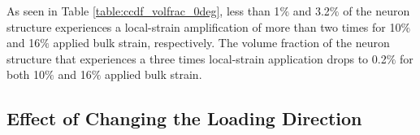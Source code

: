 \documentclass[]{interact}
\begin{document}
As seen in Table \ref{table:ccdf_volfrac_0deg}, less than 1$\%$ and 3.2$\%$ of the neuron structure experiences a local-strain amplification of more than two times for 10$\%$ and 16$\%$ applied bulk strain, respectively. The volume fraction of the neuron structure that experiences a three times local-strain application drops to 0.2$\%$ for both 10$\%$ and 16$\%$ applied bulk strain.



\subsection{Effect of Changing the Loading Direction}
\label{sec:loading_direction}
\end{document}
